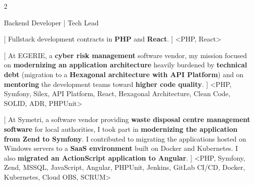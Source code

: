 \begin{paracol}{2}
\begin{leftcolumn}

Backend Developer | Tech Lead

\vspace{12pt}





\vspace{12pt}


[
Fullstack development contracts in \textbf{PHP} and \textbf{React}.
]
<PHP, React>
{}

[
	At EGERIE, a \textbf{cyber risk management} software vendor, my mission focused on
\textbf{modernizing an application architecture} heavily burdened by \textbf{technical debt}
(migration to a \textbf{Hexagonal architecture with API Platform}) and on \textbf{mentoring}
the development teams toward \textbf{higher code quality}.
]
<PHP, Symfony, Silex, API Platform, React, Hexagonal Architecture, Clean Code, SOLID, ADR, PHPUnit>{}

[
At Symetri, a software vendor providing \textbf{waste disposal centre management software} for local authorities, I took part
in \textbf{modernizing the application from Zend to Symfony}. I contributed to migrating the applications hosted on Windows servers
to a \textbf{SaaS environment} built on Docker and Kubernetes.
I also \textbf{migrated an ActionScript application to Angular}.
]
<PHP, Symfony, Zend, MSSQL, JavaScript, Angular, PHPUnit, Jenkins, GitLab CI/CD, Docker, Kubernetes, Cloud OBS, SCRUM>
{}


\end{leftcolumn}
\end{paracol}
